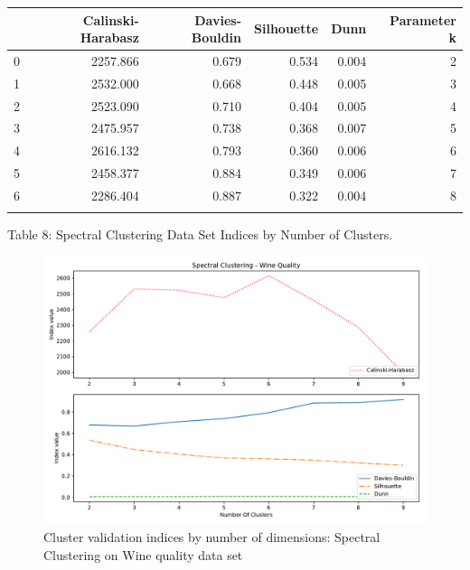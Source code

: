 \begin{tabular}{lrrrrr}



{} &  Calinski-Harabasz &  Davies-Bouldin &  Silhouette &   Dunn &  Parameter k \\ \hline
0 &           2257.866 &           0.679 &       0.534 &  0.004 &          2 \\
1 &           2532.000 &           0.668 &       0.448 &  0.005 &          3 \\
2 &           2523.090 &           0.710 &       0.404 &  0.005 &          4 \\
3 &           2475.957 &           0.738 &       0.368 &  0.007 &          5 \\
4 &           2616.132 &           0.793 &       0.360 &  0.006 &          6 \\
5 &           2458.377 &           0.884 &       0.349 &  0.006 &          7 \\
6 &           2286.404 &           0.887 &       0.322 &  0.004 &          8 \\ \newline


\end{tabular}

Table 8: Spectral Clustering Data Set Indices by Number of Clusters.  \newline

\begin{figure}[H]
    \centering
    \includegraphics[width=1\textwidth]{images/Spectral_Clustering_-_Wine_Quality.pdf}
    \caption{Cluster validation indices by number of dimensions: Spectral Clustering on Wine quality data set}
    \label{fig:my_label323}
\end{figure}

